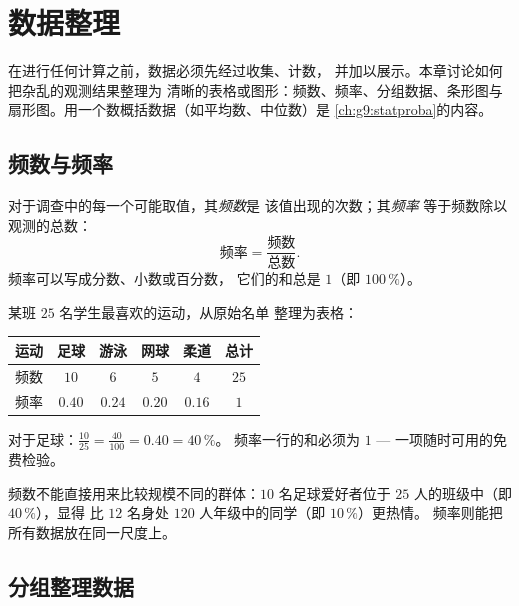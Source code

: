 \chapter{数据整理}\label{ch:g7:stats}

在进行任何计算之前，数据必须先经过收集、计数，
并加以展示。本章讨论如何把杂乱的观测结果整理为
清晰的表格或图形：频数、频率、分组数据、条形图与
扇形图。用一个数概括数据（如平均数、中位数）是
\cref{ch:g9:statproba}的内容。

\section{频数与频率}

\begin{definition}[频数与频率]\label{def:g7:stats:frequency}
对于调查中的每一个可能取值，其\emph{频数}是
该值出现的次数；其\emph{频率}
等于频数除以观测的总数：
\[
\text{频率} = \frac{\text{频数}}{\text{总数}} .
\]
频率可以写成分数、小数或百分数，
它们的和总是 $1$（即 $100\,\%$）。
\end{definition}

\begin{example}\label{ex:g7:stats:frequency}
某班 $25$ 名学生最喜欢的运动，从原始名单
整理为表格：
\begin{center}
\renewcommand{\arraystretch}{1.3}
\begin{tabular}{l|cccc|c}
运动 & 足球 & 游泳 & 网球 & 柔道 & 总计 \\
\hline
频数 & $10$ & $6$ & $5$ & $4$ & $25$ \\
频率 & $0.40$ & $0.24$ & $0.20$ & $0.16$ & $1$ \\
\end{tabular}
\end{center}
对于足球：$\frac{10}{25} = \frac{40}{100} = 0.40 = 40\,\%$。
频率一行的和必须为 $1$ --- 一项随时可用的免费检验。
\end{example}

\begin{remark}[为什么要用频率？]
频数不能直接用来比较规模不同的群体：$10$
名足球爱好者位于 $25$ 人的班级中（即 $40\,\%$），显得
比 $12$ 名身处 $120$ 人年级中的同学（即 $10\,\%$）更热情。
频率则能把所有数据放在同一尺度上。
\end{remark}

\section{分组整理数据}

